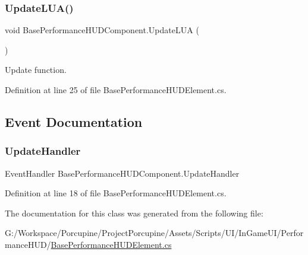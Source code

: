 \mbox{\label{class_base_performance_h_u_d_component_a1bfc49c6f269efdebc7dd3ae20e7e998}} 
\subsubsection{\texorpdfstring{Update\+L\+U\+A()}{UpdateLUA()}}
{\footnotesize\ttfamily void Base\+Performance\+H\+U\+D\+Component.\+Update\+L\+UA (\begin{DoxyParamCaption}{ }\end{DoxyParamCaption})}



Update function. 



Definition at line 25 of file Base\+Performance\+H\+U\+D\+Element.\+cs.



\subsection{Event Documentation}
\mbox{\label{class_base_performance_h_u_d_component_aa1b8ecde232b11e47d40961411b2ded5}} 
\subsubsection{\texorpdfstring{Update\+Handler}{UpdateHandler}}
{\footnotesize\ttfamily Event\+Handler Base\+Performance\+H\+U\+D\+Component.\+Update\+Handler}



Definition at line 18 of file Base\+Performance\+H\+U\+D\+Element.\+cs.



The documentation for this class was generated from the following file\+:\begin{DoxyCompactItemize}
\item 
G\+:/\+Workspace/\+Porcupine/\+Project\+Porcupine/\+Assets/\+Scripts/\+U\+I/\+In\+Game\+U\+I/\+Performance\+H\+U\+D/\hyperlink{_base_performance_h_u_d_element_8cs}{Base\+Performance\+H\+U\+D\+Element.\+cs}\end{DoxyCompactItemize}
